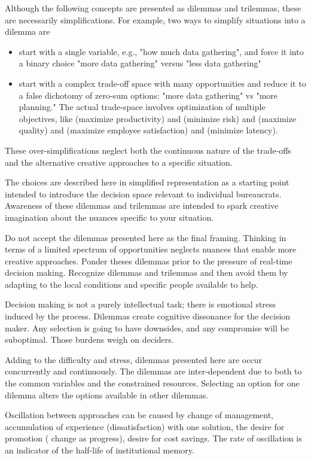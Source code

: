 Although the following concepts are presented as dilemmas and trilemmas, these are necessarily simplifications. For example, two ways to simplify situations into a dilemma are
\begin{itemize}
    \item start with a single variable, e.g., "how much data gathering", and force it into a binary choice "more data gathering" versus "less data gathering"
    \item start with a complex trade-off space with many opportunities and reduce it to a false dichotomy of zero-sum options: "more data gathering" vs "more planning." The actual trade-space involves optimization of multiple objectives, like (maximize productivity) and (minimize risk) and (maximize quality) and (maximize employee satisfaction) and (minimize latency). 
\end{itemize}
These over-simplifications neglect both the continuous nature of the trade-offs and the alternative creative approaches to a specific situation. 

The choices are described here in simplified representation as a starting point intended to introduce the decision space relevant to individual bureaucrats. Awareness of these dilemmas and trilemmas are intended to spark creative imagination about the nuances specific to your situation.

Do not accept the dilemmas presented here as the final framing. Thinking in terms of a limited spectrum of opportunities neglects nuances that enable more creative approaches. Ponder theses dilemmas prior to the pressure of real-time decision making.  Recognize dilemmas and trilemmas and then avoid them by adapting to the local conditions and specific people available to help.


Decision making is not a purely intellectual task; there is emotional stress induced by the process. Dilemmas create cognitive dissonance for the decision maker. Any selection is going to have downsides, and any compromise will be suboptimal. Those burdens weigh on deciders.

Adding to the difficulty and stress, dilemmas presented here are occur concurrently and continuously. The dilemmas are inter-dependent due to both to the common variables and the constrained resources.
Selecting an option for one dilemma alters the options available in other dilemmas.

Oscillation between approaches can be caused by change of management, accumulation of experience (dissatisfaction) with one solution, the desire for promotion ( change as progress), desire for cost savings. The rate of oscillation is an indicator of the half-life of institutional memory. 



